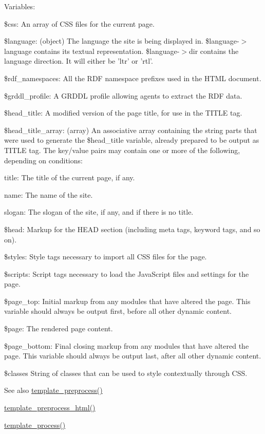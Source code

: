 Variables:
\begin{DoxyItemize}
\item \$css: An array of CSS files for the current page.
\item \$language: (object) The language the site is being displayed in. \$language-\/$>$language contains its textual representation. \$language-\/$>$dir contains the language direction. It will either be 'ltr' or 'rtl'.
\item \$rdf\_\-namespaces: All the RDF namespace prefixes used in the HTML document.
\item \$grddl\_\-profile: A GRDDL profile allowing agents to extract the RDF data.
\item \$head\_\-title: A modified version of the page title, for use in the TITLE tag.
\item \$head\_\-title\_\-array: (array) An associative array containing the string parts that were used to generate the \$head\_\-title variable, already prepared to be output as TITLE tag. The key/value pairs may contain one or more of the following, depending on conditions:
\begin{DoxyItemize}
\item title: The title of the current page, if any.
\item name: The name of the site.
\item slogan: The slogan of the site, if any, and if there is no title.
\end{DoxyItemize}
\item \$head: Markup for the HEAD section (including meta tags, keyword tags, and so on).
\item \$styles: Style tags necessary to import all CSS files for the page.
\item \$scripts: Script tags necessary to load the JavaScript files and settings for the page.
\item \$page\_\-top: Initial markup from any modules that have altered the page. This variable should always be output first, before all other dynamic content.
\item \$page: The rendered page content.
\item \$page\_\-bottom: Final closing markup from any modules that have altered the page. This variable should always be output last, after all other dynamic content.
\item \$classes String of classes that can be used to style contextually through CSS.
\end{DoxyItemize}

\begin{DoxySeeAlso}{See also}
\hyperlink{includes_2theme_8inc_a3eeb7bcdba7ef4859f99586da264d347}{template\_\-preprocess()} 

\hyperlink{includes_2theme_8inc_a5bc9f37111330a160833274482ad866a}{template\_\-preprocess\_\-html()} 

\hyperlink{includes_2theme_8inc_a9b4d56c55dab2c59b7af6f71d6b1a940}{template\_\-process()} 
\end{DoxySeeAlso}
